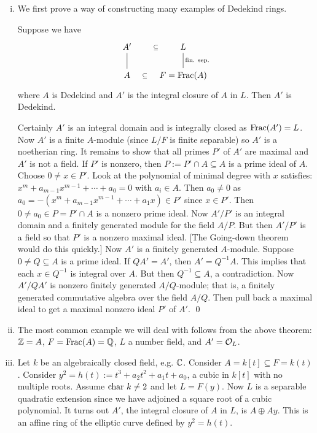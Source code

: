 \begin{ex}
\begin{enumerate}[(i)] \hfill
\item We first prove a way of constructing many examples of Dedekind rings. 
\begin{thm}
Suppose we have 
	\[
	\begin{tikzcd}
	 A' \arrow[draw=none]{r}[sloped,auto=false]{\subseteq} \arrow[dash]{d} & L \arrow[dash]{d}{\text{fin. sep.}} \\
	 A  \arrow[draw=none]{r}[sloped,auto=false]{\subseteq} & F=\Frac(A)
	 \end{tikzcd}
	\]
where $A$ is Dedekind and $A'$ is the integral closure of $A$ in $L$. Then $A'$ is Dedekind.
\end{thm}

\pf Certainly $A'$ is an integral domain and is integrally closed as $\operatorname{Frac}(A')=L$. Now $A'$ is a finite $A$-module (since $L/F$ is finite separable) so $A'$ is a noetherian ring. It remains to show that all primes $P'$ of $A'$ are maximal and $A'$ is not a field. If $P'$ is nonzero, then $P:= P' \cap A \subseteq A$ is a prime ideal of $A$. Choose $0 \neq x \in P'$. Look at the polynomial of minimal degree with $x$ satisfies: $x^m+a_{m-1}x^{m-1} + \cdots + a_0=0$ with $a_i \in A$. Then $a_0 \neq 0$ as $a_0= -(x^m + a_{m-1}x^{m-1} + \cdots + a_1x) \in P'$ since $x \in P'$. Then $0 \neq a_0 \in P=P' \cap A$ is a nonzero prime ideal. Now $A'/P'$ is an integral domain and a finitely generated module for the field $A/P$. But then $A'/P'$ is a field so that $P'$ is a nonzero maximal ideal. [The Going-down theorem would do this quickly.] Now $A'$ is a finitely generated $A$-module. Suppose $0 \neq Q \subseteq A$ is a prime ideal. If $QA'=A'$, then $A'=Q^{-1}A$. This implies that each $x \in Q^{-1}$ is integral over $A$. But then $Q^{-1} \subseteq A$, a contradiction. Now $A'/QA'$ is nonzero finitely generated $A/Q$-module; that is, a finitely generated commutative algebra over the field $A/Q$. Then pull back a maximal ideal to get a maximal nonzero ideal $P'$ of $A'$. \qed \\

\item The most common example we will deal with follows from the above theorem: $\mathbb{Z}=A$, $F=\operatorname{Frac}(A)=\mathbb{Q}$, $L$ a number field, and $A'=\mathcal{O}_L$. 

\item Let $k$ be an algebraically closed field, e.g. $\mathbb{C}$. Consider $A=k[t] \subseteq F=k(t)$. Consider $y^2=h(t):=t^3+a_2t^2+a_1t+a_0$, a cubic in $k[t]$ with no multiple roots. Assume $\text{char } k \neq 2$ and let $L=F(y)$. Now $L$ is a separable quadratic extension since we have adjoined a square root of a cubic polynomial. It turns out $A'$, the integral closure of $A$ in $L$, is $A \oplus Ay$. This is an affine ring of the elliptic curve defined by $y^2=h(t)$.



\end{enumerate}
\end{ex}
